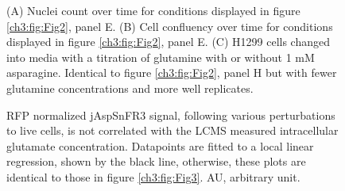 \begin{figure}[ht]
    \centering
    \caption[Plots related to glutamine limitation.]{
    (A) Nuclei count over time for conditions displayed in figure \ref{ch3:fig:Fig2}, panel E.
    (B) Cell confluency over time for conditions displayed in figure \ref{ch3:fig:Fig2}, panel E.
    (C) H1299 cells changed into media with a titration of glutamine with or without 1 mM asparagine.
    Identical to figure \ref{ch3:fig:Fig2}, panel H but with fewer glutamine concentrations and more well replicates.
    }
    \label{ch3:figsupp:f2S2}
\end{figure}

\begin{figure}[ht]
    \centering
    \caption[jAspSnFR3 signal does not correlate with glutamate concentration.]{
    RFP normalized jAspSnFR3 signal, following various perturbations to live cells, is not correlated with the LCMS measured intracellular glutamate concentration.
    Datapoints are fitted to a local linear regression, shown by the black line, otherwise, these plots are identical to those in figure \ref{ch3:fig:Fig3}.
    AU, arbitrary unit.
    }
    \label{ch3:figsupp:f3S1}
\end{figure}






